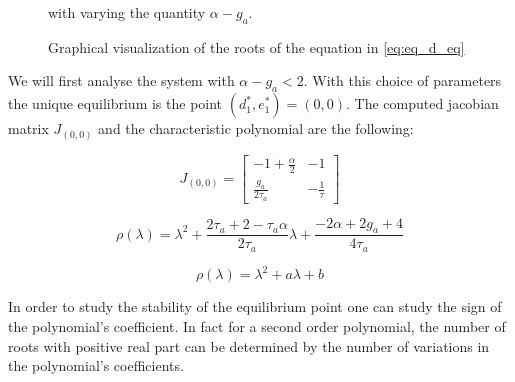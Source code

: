  \begin{figure}[!h]
        \caption{\label{fig:eq2D_adapt} Graphical visualization of the roots of the equation in \eqref{eq:eq_d_eq}} with varying the quantity $\alpha - g_a$.
\end{figure}

We will first analyse the system with $\alpha - g_a < 2$. With this choice of parameters the unique equilibrium is the point $(d_1^*,e_1^*)=(0, 0)$. The computed jacobian matrix $J_{(0,0)}$ and the characteristic polynomial are the following:

\begin{equation}
J_{(0, 0)} = \begin{bmatrix} 
-1 + \frac{\alpha}{2} & -1 \\
\frac{g_a}{2\tau_a} & -\frac{1}{\tau}
\end{bmatrix}
\end{equation}

\begin{equation}
\rho(\lambda) = \lambda^2 +  \frac{2\tau_a + 2 - \tau_a \alpha}{2\tau_a} \lambda + \frac{-2\alpha + 2g_a + 4}{4\tau_a}
\end{equation}

\begin{equation}
\rho(\lambda) = \lambda^2 + a\lambda +b
\end{equation}

In order to study the stability of the equilibrium point one can study the sign of the polynomial's coefficient. In fact for a second order polynomial, the number of roots with positive real part can be determined by the number of variations in the polynomial's coefficients.

